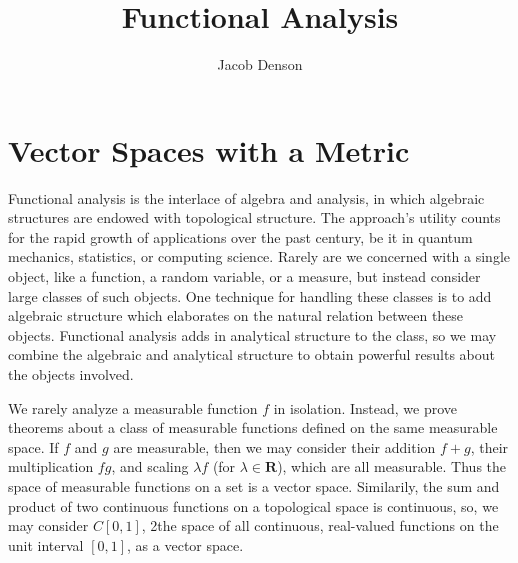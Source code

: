 


\title{Functional Analysis}
\author{Jacob Denson}



\maketitle
\tableofcontents
{}

\part{Vector Spaces with a Metric}

Functional analysis is the interlace of algebra and analysis, in which algebraic structures are endowed with topological structure. The approach's utility counts for the rapid growth of applications over the past century, be it in quantum mechanics, statistics, or computing science. Rarely are we concerned with a single object, like a function, a random variable, or a measure, but instead consider large classes of such objects. One technique for handling these classes is to add algebraic structure which elaborates on the natural relation between these objects. Functional analysis adds in analytical structure to the class, so we may combine the algebraic and analytical structure to obtain powerful results about the objects involved.

\begin{example}
    We rarely analyze a measurable function $f$ in isolation. Instead, we prove theorems about a class of measurable functions defined on the same measurable space. If $f$ and $g$ are measurable, then we may consider their addition $f + g$, their multiplication $fg$, and scaling $\lambda f$ (for $\lambda \in \mathbf{R}$), which are all measurable. Thus the space of measurable functions on a set is a vector space. Similarily, the sum and product of two continuous functions on a topological space is continuous, so, we may consider $C[0,1]$, 2the space of all continuous, real-valued functions on the unit interval $[0,1]$, as a vector space.
\end{example}

